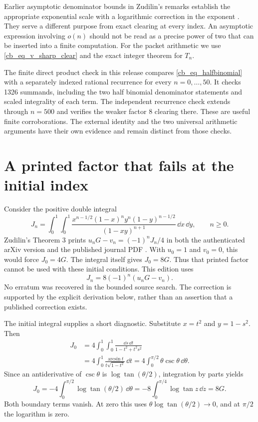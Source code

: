 Earlier asymptotic denominator bounds in Zudilin's remarks establish the
appropriate exponential scale with a logarithmic correction in the exponent
\cite{Zudilin2002}. They serve a different purpose from exact clearing at
every index. An asymptotic expression involving $o(n)$ should not be read
as a precise power of two that can be inserted into a finite computation.
For the packet arithmetic we use \eqref{cb_eq_v_sharp_clear} and the exact
integer theorem for $T_n$.

The finite direct product check in this release compares
\eqref{cb_eq_halfbinomial} with a separately indexed rational recurrence for
every $n=0,\ldots,50$. It checks 1326 summands, including the two half
binomial denominator statements and scaled integrality of each term. The
independent recurrence check extends through $n=500$ and verifies the weaker
factor $8$ clearing there. These are useful finite corroborations. The
external identity and the two universal arithmetic arguments have their
own evidence and remain distinct from those checks.

\section{A printed factor that fails at the initial index}

Consider the positive double integral
\begin{equation}\label{cb_eq_J_def}
 J_n=\int_0^1\!\int_0^1
 \frac{x^{n-1/2}(1-x)^ny^n(1-y)^{n-1/2}}
 {(1-xy)^{n+1}}\,\dd x\,\dd y,
 \qquad n\geq0.
\end{equation}
Zudilin's Theorem 3 prints $u_nG-v_n=(-1)^nJ_n/4$ in both the authenticated
arXiv version and the published journal PDF \cite{Zudilin2003}. With
$u_0=1$ and $v_0=0$, this would force $J_0=4G$.
The integral itself gives $J_0=8G$. Thus that printed factor cannot be used
with these initial conditions. This edition uses
\begin{equation}\label{cb_eq_J_correct}
 J_n=8(-1)^n(u_nG-v_n).
\end{equation}
No erratum was recovered in the bounded source search. The correction is
supported by the explicit derivation below, rather than an assertion that
a published correction exists.

The initial integral supplies a short diagnostic. Substitute $x=t^2$ and
$y=1-s^2$. Then
\begin{align*}
 J_0
 &=4\int_0^1\!\int_0^1\frac{\dd s\,\dd t}{1-t^2+t^2s^2}\\
 &=4\int_0^1\frac{\arcsin t}{t\sqrt{1-t^2}}\,\dd t
  =4\int_0^{\pi/2}\theta\csc\theta\,\dd\theta.
\end{align*}
Since an antiderivative of $\csc\theta$ is $\log\tan(\theta/2)$, integration
by parts yields
\[
 J_0=-4\int_0^{\pi/2}\log\tan(\theta/2)\,\dd\theta
     =-8\int_0^{\pi/4}\log\tan z\,\dd z=8G.
\]
Both boundary terms vanish. At zero this uses
$\theta\log\tan(\theta/2)\to0$, and at $\pi/2$ the logarithm is zero.

